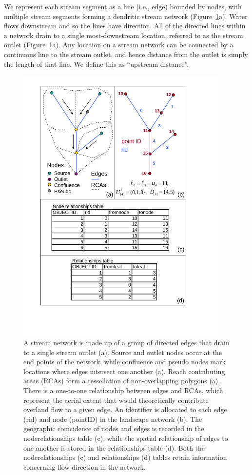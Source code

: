 \documentclass[article]{jss}
\begin{document}
We represent each stream segment as a line (i.e., edge) bounded by nodes, with multiple stream segments forming a dendritic stream network (Figure~\ref{Fig1}a). Water flows downstream and so the lines have direction. All of the directed lines within a network drain to a single most-downstream location, referred to as the stream outlet (Figure~\ref{Fig1}a). Any location on a stream network can be connected by a continuous line to the stream outlet, and hence distance from the outlet is simply the length of that line. We define this as ``upstream distance''.
\begin{figure}[htbp]
  \begin{center}
    \includegraphics[width=300pt,keepaspectratio]{Figures/Fig1.pdf}
  \end{center}
  \caption{A stream network is made up of a group of directed edges that drain to a single stream outlet (a). Source and outlet nodes occur at the end points of the network, while confluence and pseudo nodes mark locations where edges intersect one another (a). Reach contributing areas (RCAs) form a tessellation of non-overlapping polygons (a). There is a one-to-one relationship between edges and RCAs, which represent the aerial extent that would theoretically contribute overland flow to a given edge. An identifier is allocated to each edge (rid) and node (pointID) in the landscape network (b). The geographic coincidence of nodes and edges is recorded in the noderelationships table (c), while the spatial relationship of edges to one another is stored in the relationships table (d). Both the noderelationships (c) and relationships (d) tables retain information concerning flow direction in the network. \label{Fig1}}
\end{figure}
\end{document}
